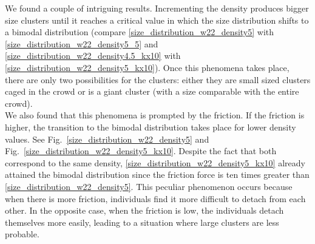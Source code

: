 We found a couple of intriguing results. Incrementing the density produces bigger size clusters until it reaches a critical value in which the size distribution shifts to a bimodal distribution (compare \ref{size_distribution_w22_density5} with \ref{size_distribution_w22_density5_5} and \ref{size_distribution_w22_density4.5_kx10} with \ref{size_distribution_w22_density5_kx10}).  Once this phenomena takes place, there are only two possibilities for the clusters: either they are small sized clusters caged in the crowd or is a giant cluster (with a size comparable with the entire crowd).\\

We also found that this phenomena is prompted by the friction. If the friction is higher, the transition to the bimodal distribution takes place for lower density values. See Fig.~\ref{size_distribution_w22_density5} and Fig.~\ref{size_distribution_w22_density5_kx10}. Despite the fact that both correspond to the same density,  \ref{size_distribution_w22_density5_kx10} already attained the bimodal distribution since the friction force is ten times greater than \ref{size_distribution_w22_density5}. This peculiar phenomenon occurs because when there is more friction, individuals find it more difficult to detach from each other. In the opposite case, when the friction is low, the individuals detach themselves more easily, leading to a situation where large clusters are less probable.\\

